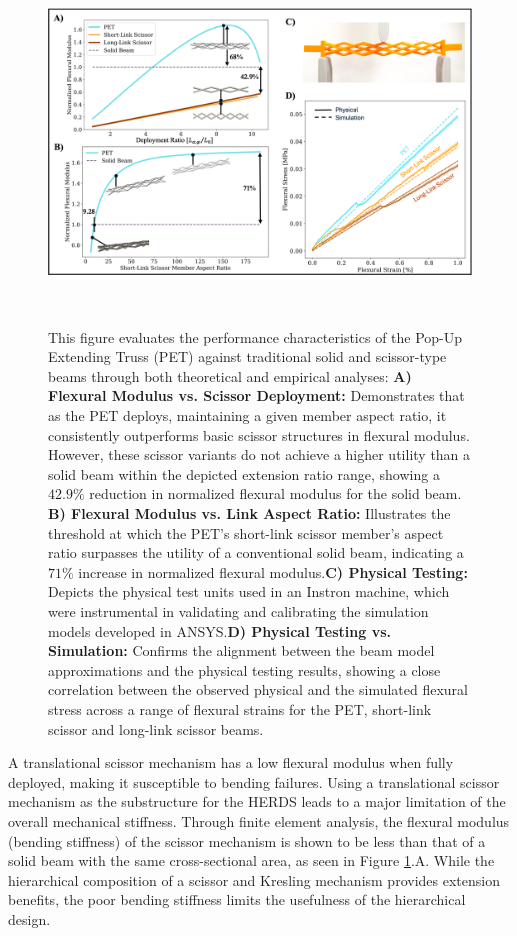 \begin{figure}
    \centering
    \includegraphics[width=\linewidth]{Figures/Figure3 - pet testing 07-10.png}
    \centering
    \caption{This figure evaluates the performance characteristics of the Pop-Up Extending Truss (PET) against traditional solid and scissor-type beams through both theoretical and empirical analyses: \textbf{A) Flexural Modulus vs. Scissor Deployment:}  Demonstrates that as the PET deploys, maintaining a given member aspect ratio, it consistently outperforms basic scissor structures in flexural modulus. However, these scissor variants do not achieve a higher utility than a solid beam within the depicted extension ratio range, showing a $42.9\%$ reduction in normalized flexural modulus for the solid beam. \textbf{B) Flexural Modulus vs. Link Aspect Ratio:} Illustrates the threshold at which the PET's short-link scissor member's aspect ratio surpasses the utility of a conventional solid beam, indicating a $71\%$ increase in normalized flexural modulus.\@\textbf{C) Physical Testing:} Depicts the physical test units used in an Instron machine, which were instrumental in validating and calibrating the simulation models developed in ANSYS.\@\textbf{D) Physical Testing vs. Simulation:} Confirms the alignment between the beam model approximations and the physical testing results, showing a close correlation between the observed physical and the simulated flexural stress across a range of flexural strains for the PET, short-link scissor and long-link scissor beams.}~\label{fig:flex_comp}
\end{figure}
A translational scissor mechanism has a low flexural modulus when fully deployed, making it susceptible to bending failures. Using a translational scissor mechanism as the substructure for the HERDS leads to a major limitation of the overall mechanical stiffness. Through finite element analysis, the flexural modulus (bending stiffness) of the scissor mechanism is shown to be less than that of a solid beam with the same cross-sectional area, as seen in Figure \ref{fig:flex_comp}.A. While the hierarchical composition of a scissor and Kresling mechanism provides extension benefits, the poor bending stiffness limits the usefulness of the hierarchical design. 

